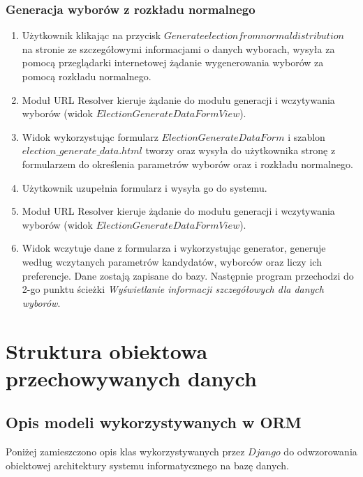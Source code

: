 \documentclass[pdflatex,11pt]{../aghdoc_version2}
\begin{document}
\subsection{Generacja wyborów z rozkładu normalnego}
\begin{enumerate}
\item Użytkownik klikając na przycisk $Generate election from normal distribution$ na stronie
ze szczegółowymi informacjami o danych wyborach, wysyła za pomocą przeglądarki
internetowej żądanie wygenerowania wyborów za pomocą rozkładu normalnego.
\item Moduł URL Resolver kieruje żądanie do modułu generacji i wczytywania wyborów (widok
$ElectionGenerateDataFormView$).
\item Widok wykorzystując formularz $ElectionGenerateDataForm$ i szablon
$election\_generate\_data.html$ tworzy oraz wysyła do użytkownika stronę z formularzem do
określenia parametrów wyborów oraz i rozkładu normalnego.  
\item Użytkownik uzupełnia formularz i wysyła go do systemu.
\item Moduł URL Resolver kieruje żądanie do modułu generacji i wczytywania wyborów (widok
$ElectionGenerateDataFormView$).
\item Widok wczytuje dane z formularza i wykorzystując generator, generuje według
wczytanych parametrów kandydatów, wyborców oraz liczy ich preferencje. Dane
zostają zapisane do bazy. Następnie program przechodzi do 2-go punktu ścieżki
\textit{Wyświetlanie informacji szczegółowych dla danych wyborów}.
\end{enumerate}

\chapter{Struktura obiektowa przechowywanych danych}
\section{Opis modeli wykorzystywanych w ORM}
Poniżej zamieszczono opis klas wykorzystywanych przez $Django$ do odwzorowania
obiektowej architektury systemu informatycznego na bazę danych.



\end{document}
